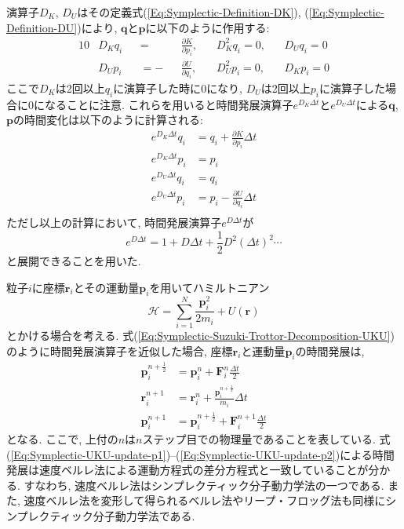 演算子$D_{K}$, $D_{U}$はその定義式(\ref{Eq:Symplectic-Definition-DK}), (\ref{Eq:Symplectic-Definition-DU})により, $\bm{q}$と$\bm{p}$に以下のように作用する:
\begin{alignat}{10}
  &D_{K}     q_{i} &&=&& \frac{\partial K}{\partial p_{i}},~~~~
  &D_{K}^{2} q_{i}   =   0,~~~~
  &D_{U}     q_{i}   =   0
  \\
  &D_{U}     p_{i} &&=-&& \frac{\partial U}{\partial q_{i}},~~~~
  &D_{U}^{2} p_{i}   =    0,~~~~
  &D_{K}     p_{i}   =    0
\end{alignat}
ここで$D_{K}$は2回以上$q_{i}$に演算子した時に$0$になり, $D_{U}$は2回以上$p_{i}$に演算子した場合に0になることに注意. これらを用いると時間発展演算子$e^{D_{K}\Delta t}$と$e^{D_{U}\Delta t}$による$\bm{q}$, $\bm{p}$の時間変化は以下のように計算される:
\begin{align}
  e^{D_{K}\Delta t} q_{i} &= q_{i} + \frac{\partial K}{\partial p_{i}} \Delta t \\
  e^{D_{K}\Delta t} p_{i} &= p_{i} \\
  e^{D_{U}\Delta t} q_{i} &= q_{i} \\
  e^{D_{U}\Delta t} p_{i} &= p_{i} - \frac{\partial U}{\partial q_{i}} \Delta t \\
\end{align}
ただし以上の計算において, 時間発展演算子$e^{D \Delta t}$が
\begin{equation}
  e^{D \Delta t} = 1 + D\Delta t + \frac{1}{2} D^{2} (\Delta t)^{2} \cdots
\end{equation}
と展開できることを用いた. 

粒子$i$に座標$\bm{r}_{i}$とその運動量$\bm{p}_{i}$を用いてハミルトニアン
\begin{equation}
  \mathcal{H} = \sum_{i=1}^{N} \frac{\bm{p}_{i}^{2}}{2m_{i}} + U(\bm{r})
\end{equation}
とかける場合を考える. 
式(\ref{Eq:Symplectic-Suzuki-Trottor-Decomposition-UKU})のように時間発展演算子を近似した場合, 座標$\bm{r}_{i}$と運動量$\bm{p}_{i}$の時間発展は, 
\begin{align}
  \bm{p}_{i}^{n+\frac{1}{2}}
  &=
  \bm{p}_{i}^{n} + \bm{F}_{i}^{n} \frac{\Delta t}{2}
  \label{Eq:Symplectic-UKU-update-p1}
  \\
  \bm{r}_{i}^{n+1}
  &=
  \bm{r}_{i}^{n} + \frac{\bm{p}_{i}^{n+\frac{1}{2}}}{m_{i}} \Delta t
  \label{Eq:Symplectic-UKU-update-r}
  \\
  \bm{p}_{i}^{n+1}
  &=
  \bm{p}_{i}^{n+\frac{1}{2}} + \bm{F}_{i}^{n+1} \frac{\Delta t}{2}
  \label{Eq:Symplectic-UKU-update-p2}
\end{align}
となる. ここで, 上付の$n$は$n$ステップ目での物理量であることを表している. 
式(\ref{Eq:Symplectic-UKU-update-p1})--(\ref{Eq:Symplectic-UKU-update-p2})による時間発展は速度ベルレ法による運動方程式の差分方程式と一致していることが分かる. 
すなわち, 速度ベルレ法はシンプレクティック分子動力学法の一つである. 
また, 速度ベルレ法を変形して得られるベルレ法やリープ・フロッグ法も同様にシンプレクティック分子動力学法である. 

